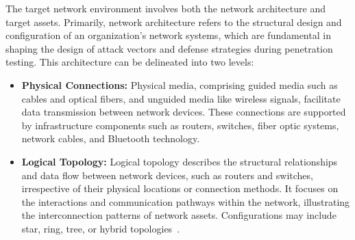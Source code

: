 The target network environment involves both the network architecture and target assets. Primarily, network architecture refers to the structural design and configuration of an organization's network systems, which are fundamental in shaping the design of attack vectors and defense strategies during penetration testing. This architecture can be delineated into two levels:

\begin{itemize}
    \item \textbf{Physical Connections:} Physical media, comprising guided media such as cables and optical fibers, and unguided media like wireless signals, facilitate data transmission between network devices. These connections are supported by infrastructure components such as routers, switches, fiber optic systems, network cables, and Bluetooth technology. 

    \item \textbf{Logical Topology:} Logical topology describes the structural relationships and data flow between network devices, such as routers and switches, irrespective of their physical locations or connection methods. It focuses on the interactions and communication pathways within the network, illustrating the interconnection patterns of network assets. Configurations may include star, ring, tree, or hybrid topologies~\cite{Brede2012NetworksAnIM}.
\end{itemize}




